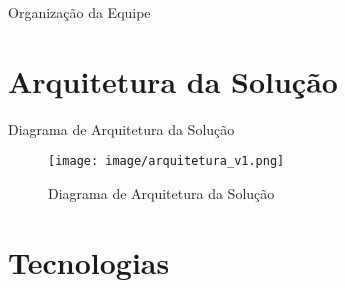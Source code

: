 \documentclass[%
    english,
    brazil]{ifsp-spo-beamer}
\begin{document}
    \begin{frame}{Organização da Equipe}
        \begin{table} \centering
            \begin{figure}
                \centering
            	\caption{\label{analise}Organização da Equipe}\resize
            	\begin{table}[]
                \end{table}
            \end{figure}
        \end{table}
    \end{frame}


\section{Arquitetura da Solução}

\begin{frame}{Diagrama de Arquitetura da Solução}
    \begin{table} \centering
        \begin{figure}
                \centering
            	\caption{\label{analise}Diagrama de Arquitetura da Solução}
            	\texttt{[image: image/arquitetura\_v1.png]}
        \end{figure}
    \end{table}
\end{frame}

\section{Tecnologias}
\end{document}
